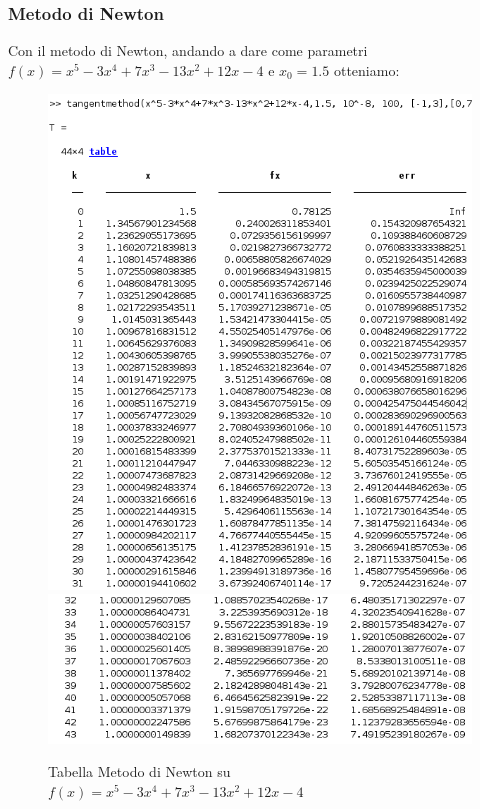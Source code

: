 \documentclass[12pt, letterpaper]{article}
\begin{document}
\subsubsection{Metodo di Newton}
Con il metodo di Newton, andando a dare come parametri $f(x)=x^5-3x^4+7x^3-13x^2+12x-4$ e $x_0=1.5$ otteniamo:
\begin{figure}[ht!]
    \includegraphics[scale=0.70]{TabellaMultiRadixNewton1.png}
    \includegraphics[scale=0.70]{TabellaMultiRadixNewton2.png}
    \caption{Tabella Metodo di Newton su $f(x)=x^5-3x^4+7x^3-13x^2+12x-4$}
\end{figure} \\
\end{document}
